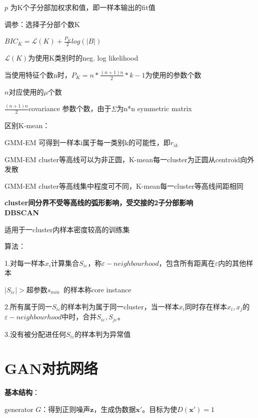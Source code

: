 \documentclass[UTF8]{ctexart}
\begin{document}
  \quad \quad \quad $p$ 为K个子分部加权求和值，即一样本输出的fit值

  调参：选择子分部个数K

  \quad $BIC_K = \mathcal{L}(K) + \frac{P_K}{2}log(|B|)$

  \quad \quad $\mathcal{L}(K)$为使用K类别时的neg. log likelihood

  \quad \quad 当使用特征个数n时，$P_K = n * \frac{(n+1)n}{2} * k - 1$为使用的参数个数

  \quad \quad \quad $n$对应使用的$\mu$个数

  \quad \quad \quad $\frac{(n+1)n}{2}$covariance 参数个数，由于$\varSigma$为n*n symmetric matrix

  区别K-mean：

  \quad GMM-EM 可得到一样本i属于每一类别k的可能性，即$r_{ik}$

  \quad GMM-EM cluster等高线可以为非正圆，K-mean每一cluster为正圆从centroid向外发散
  
  \quad GMM-EM cluster等高线集中程度可不同，K-mean每一cluster等高线间距相同
  
  \quad \quad \textbf{cluster间分界不受等高线的弧形影响，受交接的2子分部影响}\\
\textbf{DBSCAN}

  适用于一cluster内样本密度较高的训练集

  算法：

  \quad 1.对每一样本$x_i$计算集合$S_{i\varepsilon}$，称$\varepsilon -neighbourhood$，包含所有距离在$\varepsilon $内的其他样本

  \quad \quad $|S_{i\varepsilon}| > $超参数$s_{min}$\ 的样本称core instance

  \quad 2.所有属于同一$S_{i\varepsilon }$的样本判为属于同一cluster，当一样本$x_i$同时存在样本$x_i, x_j$的$\varepsilon -neighbourhood$中时，合并$S_{i\varepsilon }, S_{j\varepsilon }$。

  \quad 3.没有被分配进任何$S_{i\varepsilon }$的样本判为异常值

\section{GAN对抗网络}
\noindent \textbf{基本结构}：

  generator $G$：得到正则噪声$\mathbf{z}$，生成伪数据$\mathbf{x}'$。目标为使$D(\mathbf{x}') = 1$
  
\end{document}
